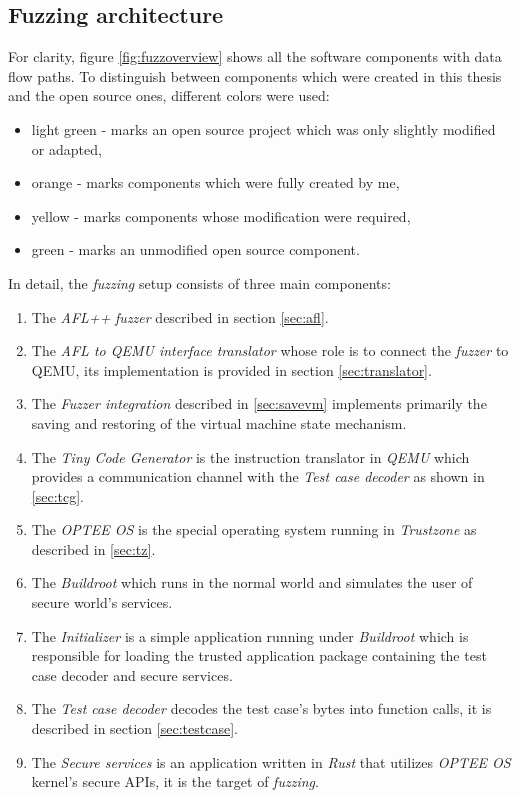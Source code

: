 \subsection{Fuzzing architecture}
For clarity, figure \ref{fig:fuzzoverview} shows all the software components with data flow paths. To distinguish between components which were created in this thesis and the open source ones, different colors were used:
\begin{itemize}
    \item \colorbox{green!30}{light green} - marks an open source project which was only slightly modified or adapted,
    \item \colorbox{orange!30}{orange} - marks components which were fully created by me,
    \item \colorbox{yellow!30}{yellow} - marks components whose modification were required,
    \item \colorbox{green!60}{green} - marks an unmodified open source component.
\end{itemize}
In detail, the \textit{fuzzing} setup consists of three main components:
\begin{enumerate}
    \item The \textit{AFL++} \textit{fuzzer} described in section \ref{sec:afl}.
    \item The \textit{AFL to QEMU interface translator} whose role is to connect the \textit{fuzzer} to QEMU, its implementation is provided in section \ref{sec:translator}.
    \item The \textit{Fuzzer integration} described in \ref{sec:savevm} implements primarily the saving and restoring of the virtual machine state mechanism.
    \item The \textit{Tiny Code Generator} is the instruction translator in \textit{QEMU} which provides a communication channel with the \textit{Test case decoder} as shown in \ref{sec:tcg}.
    \item The \textit{OPTEE OS} is the special operating system running in \textit{Trustzone} as described in \ref{sec:tz}.
    \item The \textit{Buildroot} which runs in the normal world and simulates the user of secure world's services.
    \item The \textit{Initializer} is a simple application running under \textit{Buildroot} which is responsible for loading the trusted application package containing the test case decoder and secure services.
    \item The \textit{Test case decoder} decodes the test case's bytes into function calls, it is described in section \ref{sec:testcase}.
    \item The \textit{Secure services} is an application written in \textit{Rust} that utilizes \textit{OPTEE OS} kernel's secure APIs, it is the target of \textit{fuzzing}.
\end{enumerate}

